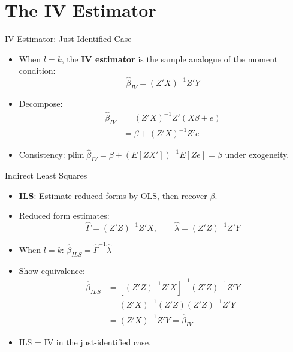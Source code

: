 \documentclass[aspectratio=169, handout]{beamer}
\numberwithin{equation}{section}
\begin{document}
\section{The IV Estimator}

\begin{frame}{IV Estimator: Just-Identified Case}
\begin{itemize}
\item When $l=k$, the \textbf{IV estimator} is the sample analogue of the moment condition:
$$\hat{\beta}_{IV} = (Z'X)^{-1}Z'Y$$
\item Decompose:
\begin{align*}
\hat{\beta}_{IV} &= (Z'X)^{-1}Z'(X\beta+e)\\
&= \beta + (Z'X)^{-1}Z'e
\end{align*}
\item Consistency: $\text{plim}\;\hat{\beta}_{IV} = \beta + (E[ZX'])^{-1}E[Ze] = \beta$ \quad under exogeneity.
\end{itemize}
\end{frame}


\begin{frame}{Indirect Least Squares}
\begin{itemize}
\item \textbf{ILS}: Estimate reduced forms by OLS, then recover $\beta$.
\item Reduced form estimates:
$$\hat{\Gamma} = (Z'Z)^{-1}Z'X, \qquad \hat{\lambda} = (Z'Z)^{-1}Z'Y$$
\item When $l=k$: $\hat{\beta}_{ILS} = \hat{\Gamma}^{-1}\hat{\lambda}$
\item Show equivalence:
\begin{align*}
\hat{\beta}_{ILS} &= [(Z'Z)^{-1}Z'X]^{-1}(Z'Z)^{-1}Z'Y\\
&= (Z'X)^{-1}(Z'Z)(Z'Z)^{-1}Z'Y\\
&= (Z'X)^{-1}Z'Y = \hat{\beta}_{IV}
\end{align*}
\item ILS = IV in the just-identified case.
\end{itemize}
\end{frame}
\end{document}
